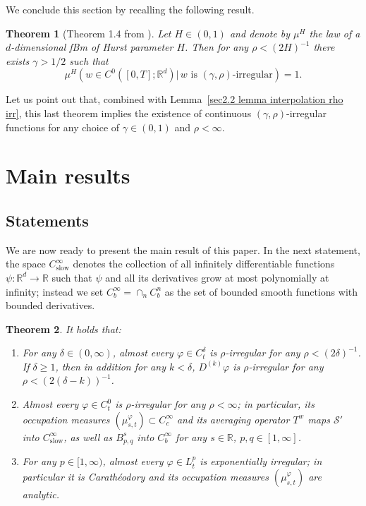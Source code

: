 \documentclass[10pt]{article}
\newcommand{\tmop}[1]{\ensuremath{\operatorname{#1}}}
\newtheorem{theorem}{Theorem}%
\begin{document}
We conclude this section by recalling the following result.

\begin{theorem}[Theorem 1.4 from {\cite{catelliergubinelli}}]
  \label{sec2.4 thm catelliergubinelli}Let $H \in (0, 1)$ and denote by
  $\mu^H$ the law of a $d$\mbox{-}dimensional fBm of Hurst parameter $H$. Then
  for any $\rho < (2 H)^{- 1}$ there exists $\gamma > 1 / 2$ such that
  \[ \mu^H \left( w \in C^0 ([0, T] ; \mathbb{R}^d)  \left| \, w \text{ is
     $(\gamma, \rho)$-irregular} \right. \right) = 1. \]
\end{theorem}

Let us point out that, combined with Lemma~\ref{sec2.2 lemma interpolation rho
irr}, this last theorem implies the existence of continuous $(\gamma,
\rho)$\mbox{-}irregular functions for any choice of $\gamma \in (0, 1)$ and
$\rho < \infty$.

\section{Main results}\label{sec3}

\subsection{Statements}\label{sec3.1}

We are now ready to present the main result of this paper. In the next
statement, the space $C^{\infty}_{\tmop{slow}}$ denotes the collection of all
infinitely differentiable functions $\psi : \mathbb{R}^d \rightarrow
\mathbb{R}$ such that $\psi$ and all its derivatives grow at most polynomially
at infinity; instead we set $C^{\infty}_b = \cap_n C^n_b$ as the set of
bounded smooth functions with bounded derivatives.

\begin{theorem}
  \label{sec3 thm2}It holds that:
  \begin{enumerate}[label=\roman*.]
    \item For any $\delta \in (0, \infty)$, almost every $\varphi \in
    C^{\delta}_t$ is $\rho$\mbox{-}irregular for any $\rho < (2 \delta)^{-
    1}$. If $\delta \geqslant 1$, then in addition for any $k < \delta$,
    $D^{(k)} \varphi$ is $\rho$\mbox{-}irregular for any $\rho < (2 (\delta -
    k))^{- 1}$.
    
    \item Almost every $\varphi \in C^0_t$ is $\rho$\mbox{-}irregular for any
    $\rho < \infty$; in particular, its occupation measures
    $(\mu^{\varphi}_{s, t}) \subset C^{\infty}_c$ and its averaging operator
    $T^w$ maps $\mathcal{S}'$ into $C^{\infty}_{\tmop{slow}}$, as well as
    $B^s_{p, q}$ into $C^{\infty}_b$ for any $s \in \mathbb{R}$, $p, q \in [1,
    \infty]$.
    
    \item For any $p \in [1, \infty)$, almost every $\varphi \in L^p_t$ is
    exponentially irregular; in particular it is Carath{\'e}odory and its
    occupation measures $(\mu^{\varphi}_{s, t})$ are analytic.
  \end{enumerate}
\end{theorem}
\end{document}
